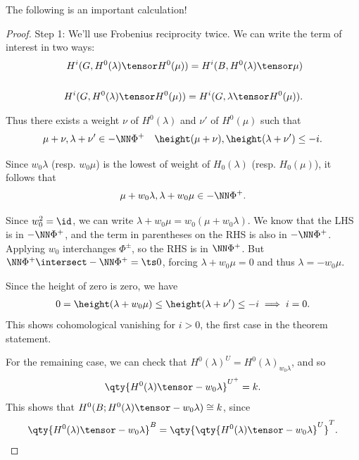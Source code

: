 The following is an important calculation!

\begin{proof}

Step 1: We'll use Frobenius reciprocity twice. We can write the term of
interest in two ways:
\begin{align*}  
H^i(G, H^0(\lambda) \tensor H^0(\mu)) =
H^i(B, H^0(\lambda) \tensor \mu)
\\ \\
H^i(G, H^0(\lambda) \tensor H^0(\mu)) =
H^i(G, \lambda \tensor H^0(\mu))
.\end{align*}

Thus there exists a weight \(\nu\) of \(H^0(\lambda)\) and \(\nu'\) of
\(H^0(\mu)\) such that
\begin{align*}  
\mu + \nu, \lambda + \nu' \in - \NN \Phi^+ \quad \height(\mu+\nu), \height(\lambda + \nu') \leq -i
.\end{align*}

Since \(w_0\lambda\) (resp. \(w_0\mu\)) is the lowest of weight of
\(H_0(\lambda)\) (resp. \(H_0(\mu)\)), it follows that
\begin{align*}  
\mu + w_0 \lambda, \lambda + w_0\mu \in -\NN \Phi^+
.\end{align*}

Since \(w_0^2 = \id\), we can write
\(\lambda + w_0\mu = w_0(\mu + w_0 \lambda)\). We know that the LHS is
in \(-\NN \Phi^+\), and the term in parentheses on the RHS is also in
\(-\NN \Phi^+\). Applying \(w_0\) interchanges \(\Phi^\pm\), so the RHS
is in \(\NN \Phi^+\). But \(\NN \Phi^+ \intersect -\NN\Phi^+ = \ts 0\),
forcing \(\lambda + w_0 \mu = 0\) and thus \(\lambda = -w_0 \mu\).

Since the height of zero is zero, we have
\begin{align*}  
0 = \height(\lambda + w_0 \mu)
\leq \height(\lambda + \nu') \leq -i \implies i=0
.\end{align*} This shows cohomological vanishing for \(i>0\), the first
case in the theorem statement.

For the remaining case, we can check that
\(H^0(\lambda)^{U} = H^0(\lambda)_{w_0 \lambda}\), and so
\begin{align*}  
\qty{H^0(\lambda) \tensor -w_0 \lambda}^{U^+} = k
.\end{align*} This shows that
\(H^0(B; H^0(\lambda) \tensor -w_0\lambda ) \cong k\), since
\begin{align*}  
\qty{H^0(\lambda) \tensor -w_0 \lambda}^B = \qty{ \qty{H^0(\lambda) \tensor -w_0 \lambda }^U }^T
.\end{align*}

\end{proof}

